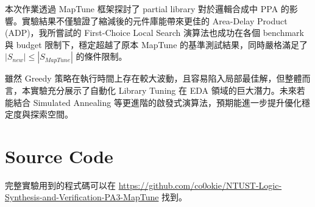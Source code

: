 \documentclass[12pt]{article}
\begin{document}
本次作業透過 MapTune 框架探討了 partial library 對於邏輯合成中 PPA 的影響。實驗結果不僅驗證了縮減後的元件庫能帶來更佳的 Area-Delay Product (ADP)，我所嘗試的 First-Choice Local Search 演算法也成功在各個 benchmark 與 budget 限制下，穩定超越了原本 MapTune 的基準測試結果，同時嚴格滿足了 $|S_{new}| \le |S_{MapTune}|$ 的條件限制。

雖然 Greedy 策略在執行時間上存在較大波動，且容易陷入局部最佳解，但整體而言，本實驗充分展示了自動化 Library Tuning 在 EDA 領域的巨大潛力。未來若能結合 Simulated Annealing 等更進階的啟發式演算法，預期能進一步提升優化穩定度與探索空間。

\section*{Source Code}

完整實驗用到的程式碼可以在 \url{https://github.com/co0okie/NTUST-Logic-Synthesis-and-Verification-PA3-MapTune} 找到。
\end{document}
